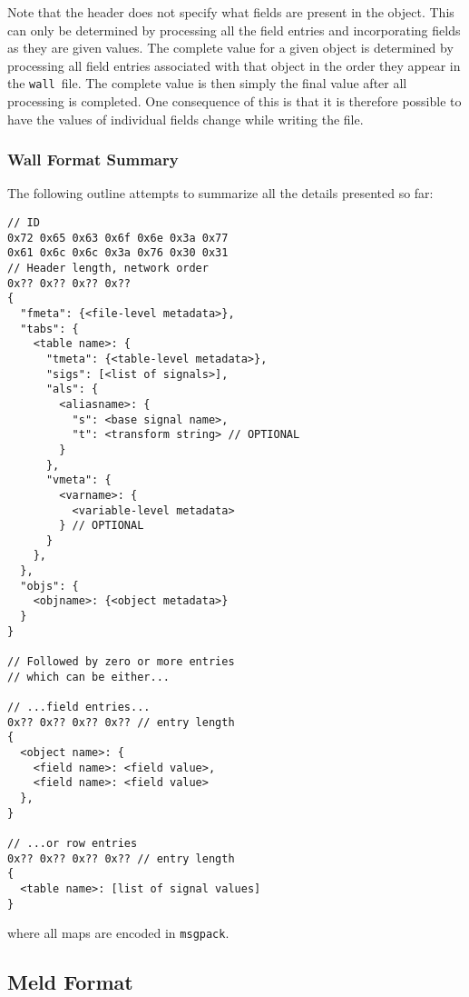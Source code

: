 \documentclass[11pt,a4paper,twocolumn]{article}
\newcommand{\wall}{\texttt{wall}}
\newcommand{\msgpack}{\texttt{msgpack}}
\begin{document}
Note that the header does not specify what fields are present in the
object.  This can only be determined by processing all the field
entries and incorporating fields as they are given values.  The
complete value for a given object is determined by processing all
field entries associated with that object in the order they appear in
the \wall\ file.  The complete value is then simply the final value
after all processing is completed.  One consequence of this is that it
is therefore possible to have the values of individual fields change
while writing the file.

\subsubsection{Wall Format Summary}


The following outline attempts to summarize all the details presented so
far:

\begin{verbatim}
// ID
0x72 0x65 0x63 0x6f 0x6e 0x3a 0x77
0x61 0x6c 0x6c 0x3a 0x76 0x30 0x31
// Header length, network order
0x?? 0x?? 0x?? 0x??
{
  "fmeta": {<file-level metadata>},
  "tabs": {
    <table name>: {
      "tmeta": {<table-level metadata>},
      "sigs": [<list of signals>],
      "als": {
        <aliasname>: {
          "s": <base signal name>,
          "t": <transform string> // OPTIONAL
        }
      },
      "vmeta": {
        <varname>: {
          <variable-level metadata>
        } // OPTIONAL
      }
    },
  },
  "objs": {
    <objname>: {<object metadata>}
  }
}

// Followed by zero or more entries
// which can be either...

// ...field entries...
0x?? 0x?? 0x?? 0x?? // entry length
{
  <object name>: {
    <field name>: <field value>,
    <field name>: <field value>
  },
}

// ...or row entries
0x?? 0x?? 0x?? 0x?? // entry length
{
  <table name>: [list of signal values]  
}
\end{verbatim}

where all maps are encoded in \msgpack.

\subsection{Meld Format}
\label{sec:meld_spec}
\end{document}
